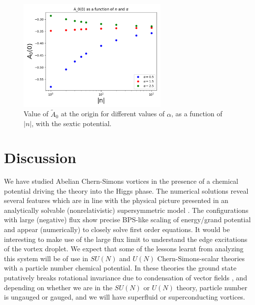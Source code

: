\begin{figure}[H]
\begin{center}
    \includegraphics[width=2.9in]{Chapter_2_Folder_1912.11321/figures/sixth_order_A0.pdf}     \caption[\textcolor{red}{This figure shows value of $\tilde A_0$ at the origin for different values of $\alpha$, as a function of $|n|$,  
 with the sextic potential.}]{{ \small Value of $\tilde A_0$ at the origin for different values of $\alpha$, as a function of $|n|$,  
 with the sextic potential.}} \label{A0sextic}
    \end{center}
\end{figure}
\section{Discussion}
We have studied Abelian Chern-Simons vortices in the presence of a chemical potential driving the theory into the Higgs phase. The numerical solutions reveal several features which are in line with the physical picture presented in an analytically solvable (nonrelativistic) supersymmetric model \cite{Tong:2015xaa, Tong:2003vy}.  The configurations with large (negative) flux show precise BPS-like scaling of energy/grand potential and appear (numerically) to closely solve first order equations.
It would be interesting to make use of the large flux limit to understand the edge excitations of the vortex droplet. We expect that some of the lessons learnt from analyzing this system will be of use in $SU(N)$ and $U(N)$ Chern-Simons-scalar theories with a particle number chemical potential. In these theories the ground state putatively breaks rotational invariance due to condensation of vector fields \cite{Kumar:2018nkf}, and depending on whether we are in the $SU(N)$ or $U(N)$ theory, particle number is ungauged or gauged,  and we will have superfluid or superconducting vortices. 



